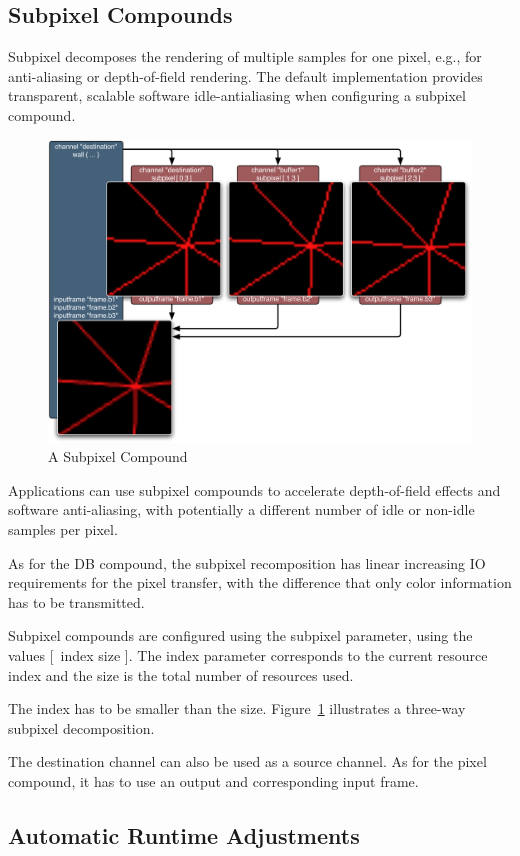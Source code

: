 \documentclass[10pt,a4]{scrartcl}
\newcommand{\fig}[1]{Figure~\ref{#1}}
\begin{document}
\subsection{\label{sSubpixel}Subpixel Compounds}

Subpixel decomposes the rendering of multiple samples for one pixel, e.g., for
anti-aliasing or depth-of-field rendering. The default implementation provides
transparent, scalable software idle-antialiasing when configuring a subpixel
compound.

\begin{figure}
  \includegraphics[width=.618\textwidth]{images/Subpixel.pdf}
  {\caption{\label{fSubpixel}\small A Subpixel Compound}}
\end{figure}
Applications can use subpixel compounds to accelerate depth-of-field effects and
software anti-aliasing, with potentially a different number of idle or non-idle
samples per pixel.

As for the DB compound, the subpixel recomposition has linear increasing 
IO requirements for the pixel transfer, with the difference that only 
color information has to be transmitted.

Subpixel compounds are configured using the \textsf{subpixel} parameter, using
the values \textsf{[~index size ]}. The \textsf{index} parameter corresponds to
the current resource index and the \textsf{size} is the total number of
resources used.

The \textsf{index} has to be smaller than the \textsf{size}. 
\fig{fSubpixel} illustrates a three-way subpixel decomposition.

The destination channel can also be used as a source channel. 
As for the pixel compound, it has to use an output and corresponding 
input frame.


\subsection{\label{sLoadBalancing}Automatic Runtime Adjustments}
\end{document}
